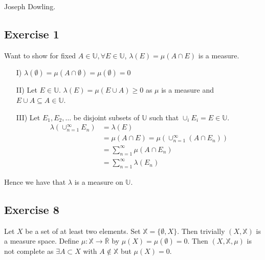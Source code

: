 \documentclass[a4paper, 12pt, twoside]{article}
\author{Joseph}
\begin{document}
Joseph Dowling.
\subsection*{Exercise 1}
Want to show for fixed $A\in \mathbb{U},\forall E\in \mathbb{U}$, $\lambda(E)=\mu(A\cap E)$ is a measure.
\begin{itemize}
    \item[I)] $\lambda(\emptyset)=\mu(A\cap\emptyset)=\mu(\emptyset)=0$
    \item[II)] Let $E\in \mathbb{U}$. $\lambda(E)=\mu(E\cup A)\geq 0$ as $\mu$ is a measure and $E\cup A \subseteq A\in \mathbb{U} $.
    \item[III)] Let $E_{1},E_{2},\dots$ be disjoint subsets of $\mathbb{U}$ such that $\cup_{i}E_{i}=E\in \mathbb{U}$.
    \begin{align*}
        \lambda(\cup_{n=1}^{\infty}E_{n}) &= \lambda(E)\\
        & = \mu(A\cap E) = \mu(\cup_{n=1}^{\infty}(A\cap E_{n}))\\
        & = \sum_{n=1}^{\infty}\mu(A\cap E_{n})\\
        & = \sum_{n=1}^{\infty}\lambda(E_{n})
    \end{align*}
\end{itemize}
Hence we have that $\lambda$ is a measure on $\mathbb{U}$.
\subsection*{Exercise 8}
Let $X$ be a set of at least two elements. Set $\mathbb{X}=\{\emptyset,X\}$. Then trivially $(X,\mathbb{X})$ is a measure space. Define $\mu:\mathbb{X}\to\overline{\mathbb{R}}$ by $\mu(X)=\mu(\emptyset)=0$. Then $(X,\mathbb{X},\mu)$ is not complete as $\exists A\subset X$ with $A\not\in \mathbb{X}$ but $\mu(X)=0$.
\end{document}
